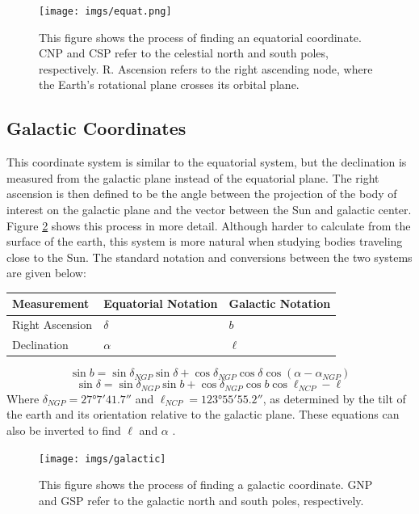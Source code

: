 \documentclass[12pt,twoside]{reedthesis}
\begin{document}
\begin{figure}[p]
    \texttt{[image: imgs/equat.png]}
    \caption{This figure shows the process of finding an equatorial coordinate. CNP and CSP refer to the celestial north and south poles, respectively. R. Ascension refers to the right ascending node, where the Earth's rotational plane crosses its orbital plane.}
    \label{equatorial-coords}
\end{figure}

\subsection*{Galactic Coordinates}

This coordinate system is similar to the equatorial system, but the declination is measured from the galactic plane instead of the equatorial plane. The right ascension is then defined to be the angle between the projection of the body of interest on the galactic plane and the vector between the Sun and galactic center. Figure \ref{galactic-coords} shows this process in more detail. Although harder to calculate from the surface of the earth, this system is more natural when studying bodies traveling close to the Sun. The standard notation and conversions between the two systems are given below:

\begin{tabular}{lll} \toprule
    Measurement & Equatorial Notation & Galactic Notation \\ \midrule
    Right Ascension &  $\delta$       & $b$               \\
    Declination     &  $\alpha$       & $\ell$            \\ \bottomrule
\end{tabular}

\begin{equation}
    \sin b = \sin \delta_{NGP} \sin \delta + \cos \delta_{NGP} \cos \delta \cos (\alpha-\alpha_{NGP})
\end{equation}
\begin{equation}
    \sin \delta = \sin \delta_{NGP} \sin b + \cos \delta_{NGP} \cos b \cos{\ell_{NCP} - \ell}
\end{equation}
Where $\delta_{NGP} = \ang{27;7;41.7}$ and $\ell_{NCP}=\ang{123;55;55.2}$, as determined by the tilt of the earth and its orientation relative to the galactic plane. These equations can also be inverted to find $\ell$ and $\alpha$ \citep[pp. 900]{modern-astrophysics}.

\begin{figure}[p]
    \texttt{[image: imgs/galactic]}
    \caption{This figure shows the process of finding a galactic coordinate. GNP and GSP refer to the galactic north and south poles, respectively.}
    \label{galactic-coords}
\end{figure}
\end{document}

